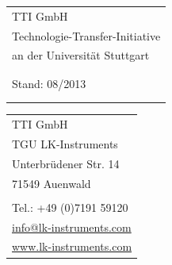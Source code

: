 \documentclass[a4paper, final, 11pt, oneside]{scrartcl}
\begin{document}
\vspace*{1pt}

  \begin{minipage}[l]{0.6\textwidth}
    \hspace*{-3.5mm}
    \footnotesize
    \begin{tabular}[t]{l@{}}
      TTI GmbH\\
      Technologie-Transfer-Initiative\\
      an der Universität Stuttgart\\
      \\
      \\
      Stand: 08/2013\\
      \\
      \\
    \end{tabular}
    \footnotesize    
  \end{minipage}
  \hfill
  \begin{minipage}[c]{0.3\textwidth}
    \begin{flushright}
      \footnotesize
      \begin{tabular}[t]{l@{}}
      TTI GmbH\\
      TGU LK-Instruments\\
      Unterbrüdener Str. 14\\
      71549 Auenwald\\
      \\
      Tel.: +49 (0)7191 59120\\
      \href{mailto:info@lk-instruments.com}{info@lk-instruments.com}\\
      \href{http://www.lk-instruments.com}{www.lk-instruments.com}\\
    \end{tabular}
    \end{flushright}
  \end{minipage}
  
\vspace*{1pt}
\end{document}
